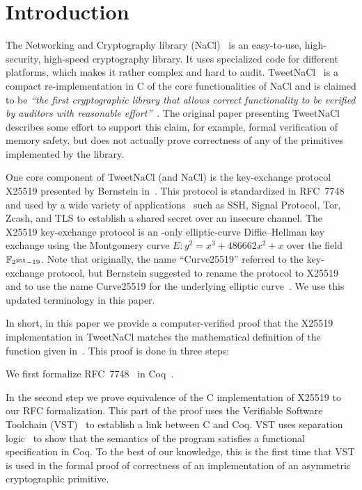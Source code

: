 \section{Introduction}
\label{sec:intro}

The Networking and Cryptography library (NaCl)~\cite{BLS12}
is an easy-to-use, high-security, high-speed cryptography library.
It uses specialized code for different platforms, which makes it rather complex and hard to audit.
TweetNaCl~\cite{BGJ+15} is a compact re-implementation in C
of the core functionalities of NaCl and is claimed to be
\emph{``the first cryptographic library that allows correct functionality
  to be verified by auditors with reasonable effort''}~\cite{BGJ+15}.
The original paper presenting TweetNaCl describes some effort to support
this claim, for example, formal verification of memory safety, but does not actually
prove correctness of any of the primitives implemented by the library.

One core component of TweetNaCl (and NaCl) is the key-exchange protocol X25519 presented
by Bernstein in~\cite{Ber06}.
This protocol is standardized in RFC~7748 and used by a wide variety of applications~\cite{things-that-use-curve25519}
such as SSH, Signal Protocol, Tor, Zcash, and TLS to establish a shared secret over
an insecure channel.
The X25519 key-exchange protocol is an \xcoord-only
elliptic-curve Diffie--Hellman key exchange using the Montgomery
curve $E: y^2 = x^3 + 486662 x^2 + x$ over the field $\mathbb{F}_{2^{255}-19}$.
Note that originally, the name ``Curve25519'' referred to the key-exchange protocol,
but Bernstein suggested to rename the protocol to X25519 and to use the name
Curve25519 for the underlying elliptic curve~\cite{Ber14}.
We use this updated terminology in this paper.

In short, in this paper we provide a computer-verified proof that the
X25519 implementation in TweetNaCl matches the mathematical definition
of the function given in~\cite[Sec.~2]{Ber06}.
This proof is done in three steps:

We first formalize RFC~7748~\cite{rfc7748} in Coq~\cite{coq-faq}.

In the second step we prove equivalence of the C implementation of X25519
to our RFC formalization.
This part of the proof uses the Verifiable Software Toolchain (VST)~\cite{2012-Appel}
to establish a link between C and Coq.
VST uses separation logic~\cite{1969-Hoare,Reynolds02separationlogic}
to show that the semantics of the program satisfies a functional specification in Coq.
To the best of our knowledge, this is the first time that VST
is used in the formal proof of correctness of an implementation
of an asymmetric cryptographic primitive.

